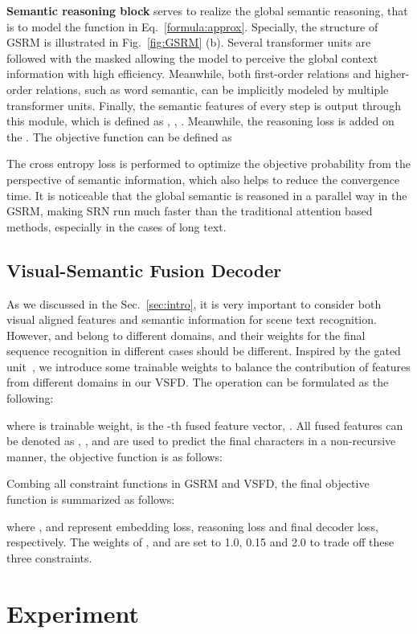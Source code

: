 \documentclass[10pt,twocolumn,letterpaper]{article}
\begin{document}
\begin{CJK}{UTF8}{gbsn}
\textbf{Semantic reasoning block} serves to realize the global semantic reasoning, that is to model the function  in Eq.~\ref{formula:approx}. Specially, the structure of GSRM is illustrated in Fig.~\ref{fig:GSRM} (b). 
Several transformer units are followed with the masked  allowing the model to perceive the global context information with high efficiency. Meanwhile, both first-order relations and higher-order relations, such as word semantic, can be implicitly modeled by multiple transformer units.
Finally, the semantic features of every step is output through this module, which is defined as , , . Meanwhile, the reasoning loss  is added on the . The objective function can be defined as

The cross entropy loss is performed to optimize the objective probability from the perspective of semantic information, which also helps to reduce the convergence time. 
It is noticeable that the global semantic is reasoned in a parallel way in the GSRM, making SRN run much faster than the traditional attention based methods, especially in the cases of long text.


\subsection{Visual-Semantic Fusion Decoder} \label{sec:Visual-Semantic Fusion Decoder}
As we discussed in the Sec.~\ref{sec:intro}, it is very important to consider both visual aligned features  and semantic information  for scene text recognition.
However,  and  belong to different domains, and their weights for the final sequence recognition in different cases should be different.
Inspired by the gated unit~\cite{arevalo2017gated}, we introduce some trainable weights to balance the contribution of features from different domains in our VSFD.
The operation can be formulated as the following:

where  is trainable weight,  is the -th fused feature vector, . All fused features can be denoted as , , and are used to predict the final characters in a non-recursive manner, the objective function is as follows:


Combing all constraint functions in GSRM and VSFD, the final objective function is summarized as follows:

where ,  and  represent embedding loss, reasoning loss and final decoder loss, respectively. The weights of ,  and  are set to 1.0, 0.15 and 2.0 to trade off these three constraints. 

\section{Experiment}\label{sec:experiment}


\end{CJK}
\end{document}
